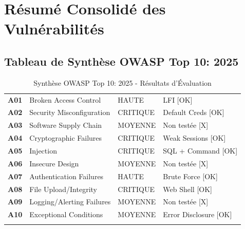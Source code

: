 \documentclass[12pt,a4paper,openany]{report}
\begin{document}
	
	\chapter{Résumé Consolidé des Vulnérabilités}
	
	\section{Tableau de Synthèse OWASP Top 10: 2025}
	
	\begin{longtable}{p{2.2cm} p{4.2cm} >{\centering\arraybackslash}p{2.2cm} p{4.2cm}}
		\hline
		\rowcolor{tablerowalt}
		\textbf{A01} & Broken Access Control & HAUTE & LFI [OK] \\
		
		\textbf{A02} & Security Misconfiguration & CRITIQUE & Default Creds [OK] \\
		
		\rowcolor{tablerowalt}
		\textbf{A03} & Software Supply Chain & MOYENNE & Non testée [X] \\
		
		\textbf{A04} & Cryptographic Failures & CRITIQUE & Weak Sessions [OK] \\
		
		\rowcolor{tablerowalt}
		\textbf{A05} & Injection & CRITIQUE & SQL + Command [OK] \\
		
		\textbf{A06} & Insecure Design & MOYENNE & Non testée [X] \\
		
		\rowcolor{tablerowalt}
		\textbf{A07} & Authentication Failures & HAUTE & Brute Force [OK] \\
		
		\textbf{A08} & File Upload/Integrity & CRITIQUE & Web Shell [OK] \\
		
		\rowcolor{tablerowalt}
		\textbf{A09} & Logging/Alerting Failures & MOYENNE & Non testée [X] \\
		
		\textbf{A10} & Exceptional Conditions & MOYENNE & Error Disclosure [OK] \\
		
		\caption{Synthèse OWASP Top 10: 2025 - Résultats d'Évaluation}
		\label{tab:owasp-summary}
	\end{longtable}
	
\end{document}
